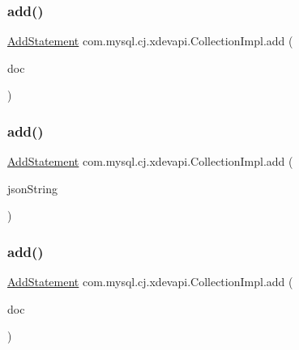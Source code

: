 \subsubsection{\texorpdfstring{add()}{add()}\hspace{0.1cm}{\footnotesize\ttfamily [1/4]}}
{\footnotesize\ttfamily \mbox{\hyperlink{interfacecom_1_1mysql_1_1cj_1_1xdevapi_1_1_add_statement}{Add\+Statement}} com.\+mysql.\+cj.\+xdevapi.\+Collection\+Impl.\+add (\begin{DoxyParamCaption}\item[{Map$<$ String, ?$>$}]{doc }\end{DoxyParamCaption})}

\mbox{\label{classcom_1_1mysql_1_1cj_1_1xdevapi_1_1_collection_impl_a8a5eb95ee49f4281ee578cb161b186d7}} 
\subsubsection{\texorpdfstring{add()}{add()}\hspace{0.1cm}{\footnotesize\ttfamily [2/4]}}
{\footnotesize\ttfamily \mbox{\hyperlink{interfacecom_1_1mysql_1_1cj_1_1xdevapi_1_1_add_statement}{Add\+Statement}} com.\+mysql.\+cj.\+xdevapi.\+Collection\+Impl.\+add (\begin{DoxyParamCaption}\item[{String...}]{json\+String }\end{DoxyParamCaption})}

\mbox{\label{classcom_1_1mysql_1_1cj_1_1xdevapi_1_1_collection_impl_a88f5836a8e460d3c819a3e5540cb50ff}} 
\subsubsection{\texorpdfstring{add()}{add()}\hspace{0.1cm}{\footnotesize\ttfamily [3/4]}}
{\footnotesize\ttfamily \mbox{\hyperlink{interfacecom_1_1mysql_1_1cj_1_1xdevapi_1_1_add_statement}{Add\+Statement}} com.\+mysql.\+cj.\+xdevapi.\+Collection\+Impl.\+add (\begin{DoxyParamCaption}\item[{\mbox{\hyperlink{interfacecom_1_1mysql_1_1cj_1_1xdevapi_1_1_db_doc}{Db\+Doc}}}]{doc }\end{DoxyParamCaption})}


